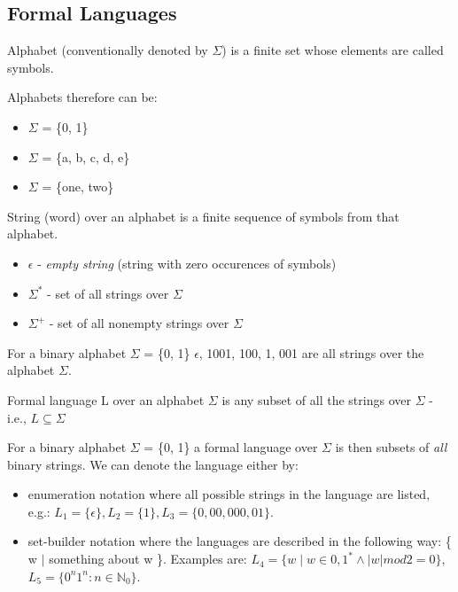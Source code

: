 \subsection{Formal Languages}

\begin{definition}
Alphabet (conventionally denoted by $\Sigma$) is a finite set whose elements are called symbols.
\end{definition}
Alphabets therefore can be:
\begin{itemize}
    \item $\Sigma$ = \{0, 1\}
    \item $\Sigma$ = \{a, b, c, d, e\}
    \item $\Sigma$ = \{one, two\}
\end{itemize}

\begin{definition}
String (word) over an alphabet is a finite sequence of symbols from that alphabet.
\end{definition}
\begin{itemize}
    \item $\epsilon$ - \textit{empty string} (string with zero occurences of symbols)
    \item $\Sigma^{*}$ - set of all strings over $\Sigma$
    \item $\Sigma^{+}$ - set of all nonempty strings over $\Sigma$
\end{itemize}
For a binary alphabet $\Sigma$ = \{0, 1\} $\epsilon$, 1001, 100, 1, 001 are all strings over the alphabet $\Sigma$.

\begin{definition}
Formal language L over an alphabet $\Sigma$ is any subset of all the strings over $\Sigma$ - i.e., $L \subseteq \Sigma$
\end{definition}
For a binary alphabet $\Sigma$ = \{0, 1\} a formal language over $\Sigma$ is then subsets of \textit{all} binary strings. We can denote the language either by:
\begin{itemize}
    \item enumeration notation where all possible strings in the language are listed, e.g.: $\textit{L}_1 = \{\epsilon\}, \textit{L}_2 = \{1\}, \textit{L}_3 = \{0, 00, 000, 01\}$.
    \item set-builder notation where the languages are described in the following way: \{ w $\mid$ something about w \}. Examples are: $\textit{L}_4 = \{\textit{w} \mid \textit{w} \in {0,1}^* \wedge \left|\textit{w}\right| mod 2 = 0\}$, $\textit{L}_5 = \{0^\textit{n}1^\textit{n} : \textit{n} \in \mathbb{N}_0\}$.
\end{itemize}

